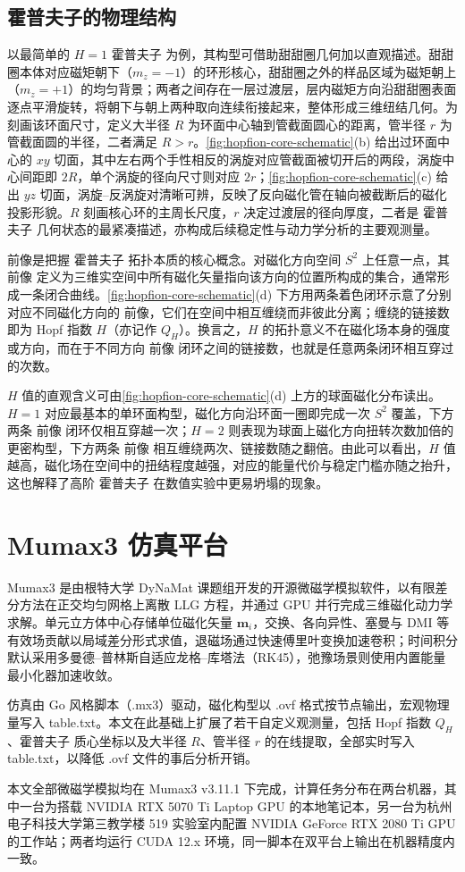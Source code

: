 \subsection{霍普夫子的物理结构}
以最简单的 $H = 1$ 霍普夫子 为例，其构型可借助甜甜圈几何加以直观描述。甜甜圈本体对应磁矩朝下（$m_z = -1$）的环形核心，甜甜圈之外的样品区域为磁矩朝上（$m_z = +1$）的均匀背景；两者之间存在一层过渡层，层内磁矩方向沿甜甜圈表面逐点平滑旋转，将朝下与朝上两种取向连续衔接起来，整体形成三维纽结几何。为刻画该环面尺寸，定义大半径 $R$ 为环面中心轴到管截面圆心的距离，管半径 $r$ 为管截面圆的半径，二者满足 $R > r$。\cref{fig:hopfion-core-schematic}(b) 给出过环面中心的 $xy$ 切面，其中左右两个手性相反的涡旋对应管截面被切开后的两段，涡旋中心间距即 $2R$，单个涡旋的径向尺寸则对应 $2r$；\cref{fig:hopfion-core-schematic}(c) 给出 $yz$ 切面，涡旋–反涡旋对清晰可辨，反映了反向磁化管在轴向被截断后的磁化投影形貌。$R$ 刻画核心环的主周长尺度，$r$ 决定过渡层的径向厚度，二者是 霍普夫子 几何状态的最紧凑描述，亦构成后续稳定性与动力学分析的主要观测量。

前像是把握 霍普夫子 拓扑本质的核心概念。对磁化方向空间 $S^2$ 上任意一点，其 前像 定义为三维实空间中所有磁化矢量指向该方向的位置所构成的集合，通常形成一条闭合曲线。\cref{fig:hopfion-core-schematic}(d) 下方用两条着色闭环示意了分别对应不同磁化方向的 前像，它们在空间中相互缠绕而非彼此分离；缠绕的链接数即为 Hopf 指数 $H$（亦记作 $Q_H$）。换言之，$H$ 的拓扑意义不在磁化场本身的强度或方向，而在于不同方向 前像 闭环之间的链接数，也就是任意两条闭环相互穿过的次数。

$H$ 值的直观含义可由\cref{fig:hopfion-core-schematic}(d) 上方的球面磁化分布读出。$H = 1$ 对应最基本的单环面构型，磁化方向沿环面一圈即完成一次 $S^2$ 覆盖，下方两条 前像 闭环仅相互穿越一次；$H = 2$ 则表现为球面上磁化方向扭转次数加倍的更密构型，下方两条 前像 相互缠绕两次、链接数随之翻倍。由此可以看出，$H$ 值越高，磁化场在空间中的扭结程度越强，对应的能量代价与稳定门槛亦随之抬升，这也解释了高阶 霍普夫子 在数值实验中更易坍塌的现象。

\section{Mumax3 仿真平台}

Mumax3 是由根特大学 DyNaMat 课题组开发的开源微磁学模拟软件\cite{vansteenkiste2014design}，以有限差分方法在正交均匀网格上离散 LLG 方程，并通过 GPU 并行完成三维磁化动力学求解。单元立方体中心存储单位磁化矢量 $\mathbf{m}_i$，交换、各向异性、塞曼与 DMI 等有效场贡献以局域差分形式求值，退磁场通过快速傅里叶变换加速卷积；时间积分默认采用多曼德–普林斯自适应龙格–库塔法（RK45），弛豫场景则使用内置能量最小化器加速收敛。

仿真由 Go 风格脚本（.mx3）驱动，磁化构型以 .ovf 格式按节点输出，宏观物理量写入 table.txt。本文在此基础上扩展了若干自定义观测量，包括 Hopf 指数 $Q_H$、霍普夫子 质心坐标以及大半径 $R$、管半径 $r$ 的在线提取，全部实时写入 table.txt，以降低 .ovf 文件的事后分析开销。

本文全部微磁学模拟均在 Mumax3 v3.11.1 下完成，计算任务分布在两台机器，其中一台为搭载 NVIDIA RTX 5070 Ti Laptop GPU 的本地笔记本，另一台为杭州电子科技大学第三教学楼 519 实验室内配置 NVIDIA GeForce RTX 2080 Ti GPU 的工作站；两者均运行 CUDA 12.x 环境，同一脚本在双平台上输出在机器精度内一致。
